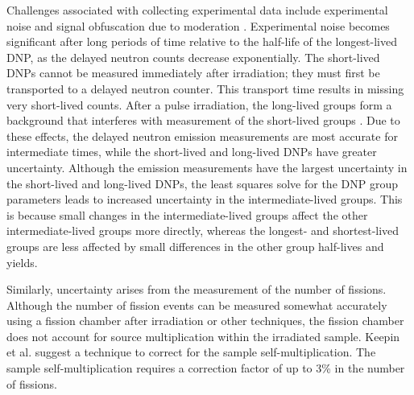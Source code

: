 Challenges associated with collecting experimental data include experimental noise and signal obfuscation due to moderation \cite{bank2000jef}. 
Experimental noise becomes significant after long periods of time relative to the half-life of the longest-lived \gls{DNP}, as the delayed neutron counts decrease exponentially.
The short-lived \glspl{DNP} cannot be measured immediately after irradiation; they must first be transported to a delayed neutron counter.
This transport time results in missing very short-lived counts.
After a pulse irradiation, the long-lived groups form a background that interferes with measurement of the short-lived groups \cite{bank2000jef}.
Due to these effects, the delayed neutron emission measurements are most accurate for intermediate times, while the short-lived and long-lived \glspl{DNP} have greater uncertainty.
Although the emission measurements have the largest uncertainty in the short-lived and long-lived \glspl{DNP}, the least squares solve for the \gls{DNP} group parameters leads to increased uncertainty in the intermediate-lived groups.
This is because small changes in the intermediate-lived groups affect the other intermediate-lived groups more directly, whereas the longest- and shortest-lived groups are less affected by small differences in the other group half-lives and yields.

Similarly, uncertainty arises from the measurement of the number of fissions.
Although the number of fission events can be measured somewhat accurately using a fission chamber after irradiation or other techniques, the fission chamber does not account for source multiplication within the irradiated sample.
Keepin et al. suggest a technique to correct for the sample self-multiplication.
The sample self-multiplication requires a correction factor of up to 3\% in the number of fissions.

